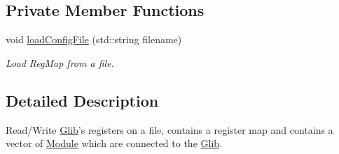 \subsection*{Private Member Functions}
\begin{DoxyCompactItemize}
\item 
void \hyperlink{class_ph2___hw_description_1_1_glib_a2eb8576c349ced2ac44904179294bd42}{load\-Config\-File} (std\-::string filename)
\begin{DoxyCompactList}\small\item\em Load Reg\-Map from a file. \end{DoxyCompactList}\end{DoxyCompactItemize}


\subsection{Detailed Description}
Read/\-Write \hyperlink{class_ph2___hw_description_1_1_glib}{Glib}'s registers on a file, contains a register map and contains a vector of \hyperlink{class_ph2___hw_description_1_1_module}{Module} which are connected to the \hyperlink{class_ph2___hw_description_1_1_glib}{Glib}. 

